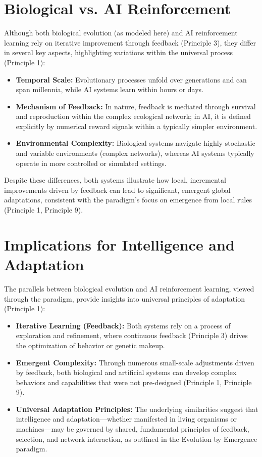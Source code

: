 \section{Biological vs. AI Reinforcement}
Although both biological evolution (as modeled here) and AI reinforcement learning rely on iterative improvement through feedback (Principle 3), they differ in several key aspects, highlighting variations within the universal process (Principle 1):
\begin{itemize}
    \item \textbf{Temporal Scale:} Evolutionary processes unfold over generations and can span millennia, while AI systems learn within hours or days.
    \item \textbf{Mechanism of Feedback:} In nature, feedback is mediated through survival and reproduction within the complex ecological network; in AI, it is defined explicitly by numerical reward signals within a typically simpler environment.
    \item \textbf{Environmental Complexity:} Biological systems navigate highly stochastic and variable environments (complex networks), whereas AI systems typically operate in more controlled or simulated settings.
\end{itemize}
Despite these differences, both systems illustrate how local, incremental improvements driven by feedback can lead to significant, emergent global adaptations, consistent with the paradigm's focus on emergence from local rules (Principle 1, Principle 9). %

\section{Implications for Intelligence and Adaptation}
The parallels between biological evolution and AI reinforcement learning, viewed through the paradigm, provide insights into universal principles of adaptation (Principle 1):
\begin{itemize}
    \item \textbf{Iterative Learning (Feedback):} Both systems rely on a process of exploration and refinement, where continuous feedback (Principle 3) drives the optimization of behavior or genetic makeup.
    \item \textbf{Emergent Complexity:} Through numerous small-scale adjustments driven by feedback, both biological and artificial systems can develop complex behaviors and capabilities that were not pre-designed (Principle 1, Principle 9).
    \item \textbf{Universal Adaptation Principles:} The underlying similarities suggest that intelligence and adaptation—whether manifested in living organisms or machines—may be governed by shared, fundamental principles of feedback, selection, and network interaction, as outlined in the Evolution by Emergence paradigm.
\end{itemize} %


